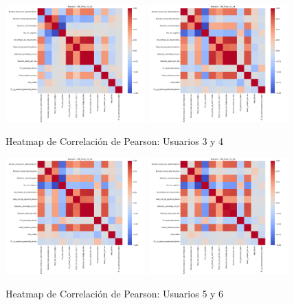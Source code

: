 \documentclass[12pt,letterpaper,twoside]{report}
\begin{document}
\begin{figure}[H]
\centering
\includegraphics[width=0.48\textwidth]{figuras/DB_final_v3_u3_heatmap_pearson.png}
\includegraphics[width=0.48\textwidth]{figuras/DB_final_v3_u4_heatmap_pearson.png}
\caption{Heatmap de Correlación de Pearson: Usuarios 3 y 4}
\end{figure}

\begin{figure}[H]
\centering
\includegraphics[width=0.48\textwidth]{figuras/DB_final_v3_u5_heatmap_pearson.png}
\includegraphics[width=0.48\textwidth]{figuras/DB_final_v3_u6_heatmap_pearson.png}
\caption{Heatmap de Correlación de Pearson: Usuarios 5 y 6}
\end{figure}
\end{document}
